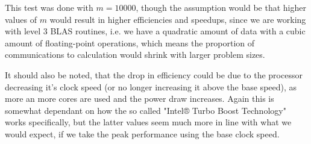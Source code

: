 \documentclass{scrartcl}
\begin{document}
This test was done with $m=10000$, though the assumption would be that higher values of $m$ would result in higher efficiencies and speedups, since we are working with level 3 BLAS routines, i.e. we have a quadratic amount of data with a cubic amount of floating-point operations, which means the proportion of communications to calculation would shrink with larger problem sizes.

It should also be noted, that the drop in efficiency could be due to the processor decreasing it's clock speed (or no longer increasing it above the base speed), as more an more cores are used and the power draw increases.
Again this is somewhat dependant on how the so called "Intel® Turbo Boost Technology" works specifically, but the latter values seem much more in line with what we would expect, if we take the peak performance using the base clock speed.
\end{document}
